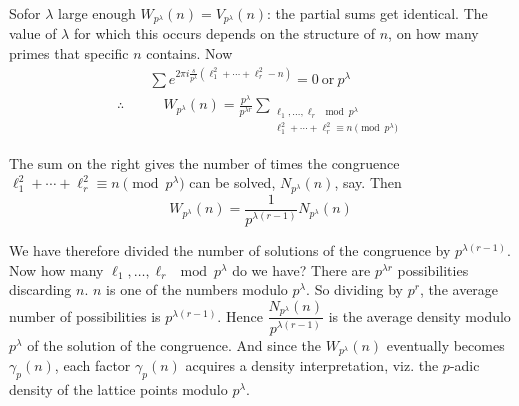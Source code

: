 So\pageoriginale for $\lambda$ large enough $W_{p^\lambda}(n)=
V_{p^\lambda}(n)$: the partial sums get identical. The value of
$\lambda$ for which this occurs depends on the structure of $n$, on
how many primes that specific $n$ contains. Now 
\begin{align*}
  & \sum e^{2 \pi i \frac{s}{p^\lambda} (\ell_1^2 + \cdots +
  \ell_r^2-n)} = 0 ~\text{or}~p^\lambda \\
  \therefore \quad & \quad W_{p^\lambda}(n) =
  \frac{p^\lambda}{p^{\lambda r}} \sum_{\substack{\ell_1, \ldots ,
      \ell_r \mod p^\lambda\\\ell_1^2 + \cdots + \ell_r^2 \equiv n
      \pmod{p^\lambda}}}
\end{align*}

The sum on the right gives the number of times the congruence \break
$\ell_1^2 + \cdots + \ell_r^2 \equiv n \pmod{p^\lambda}$ can be
solved, $N_{p^\lambda} (n)$, say. Then
$$
W_{p^\lambda}(n) = \frac{1}{p^{\lambda(r-1)}} N_{p^\lambda}(n) 
$$

We have therefore divided the number of solutions of the congruence by
$p^{\lambda(r-1)}$. Now how many $\ell_1, \ldots , \ell_r \mod
p^\lambda$ do we have? There are $p^{\lambda r}$ possibilities
discarding $n$. $n$ is one of the numbers modulo $p^\lambda$. So
dividing by $p^r$, the average number of possibilities is $p^{\lambda
  (r-1)}$. Hence $\dfrac{N_{p^\lambda}(n)}{p^{\lambda (r-1)}}$ is the
  average density modulo $p^\lambda$ of the solution of the
  congruence. And since the $W_{p^\lambda} (n)$ eventually becomes
  $\gamma_p (n)$, each factor $\gamma_p (n)$ acquires a density
  interpretation, viz. the $p$-adic density of the lattice points
  modulo $p^\lambda$.

